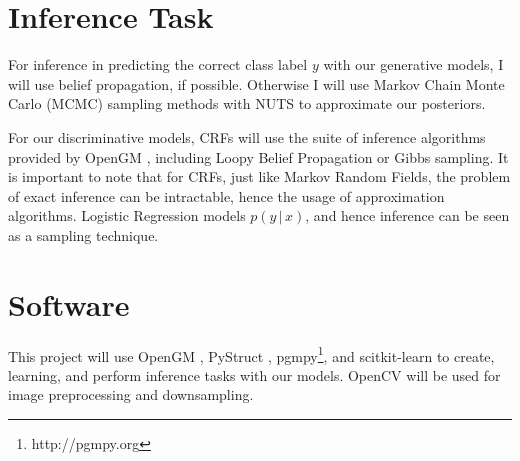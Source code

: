 \documentclass{article}
\begin{document}
\section{Inference Task}
For inference in predicting the correct class label $y$ with our
generative models, I will use belief
propagation, if possible. Otherwise I will use Markov Chain Monte Carlo (MCMC)
sampling methods with NUTS \cite{NUTS} to approximate our posteriors.

For our discriminative models, CRFs will use the suite of inference algorithms
provided by OpenGM \cite{opengm}, including Loopy Belief Propagation or
Gibbs sampling. It is important to note that for CRFs, just like Markov Random Fields,
the problem of exact inference can be intractable, hence the
usage of approximation algorithms. Logistic Regression models $p(y \, | \, x)$,
and hence inference can be seen as a sampling technique.

\section{Software}
This project will use OpenGM \cite{opengm}, PyStruct \cite{pystruct},
pgmpy\footnote{http://pgmpy.org}, and scitkit-learn \cite{scikit-learn} to
create, learning, and perform inference tasks with our models.
OpenCV \cite{opencv} will be used for image preprocessing and downsampling.






\end{document}
